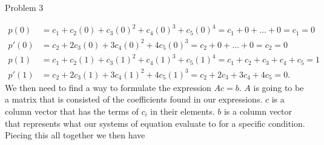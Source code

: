 \begin{problem}{Problem 3}
\begin{highlight}[Solution]
        \begin{align}
            p(0) & = c_{1} + c_{2}(0) + c_{3}(0)^{2} + c_{4}(0)^{3} + c_{5}(0)^{4} = c_{1} + 0 + \dots + 0 = c_{1} = 0 \\
            p'(0) & = c_{2} + 2c_{3}(0) + 3c_{4}(0)^{2} + 4c_{5}(0)^{3} = c_{2} + 0 + \dots + 0 = c_{2} = 0 \\
            p(1) & = c_{1} + c_{2}(1) + c_{3}(1)^{2} + c_{4}(1)^{3} + c_{5}(1)^{4} = c_{1} + c_{2} + c_{3} + c_{4} + c_{5} = 1 \\
            p'(1) & = c_{2} + 2c_{3}(1) + 3c_{4}(1)^{2} + 4c_{5}(1)^{3} = c_{2} + 2c_{3} + 3c_{4} + 4c_{5} = 0.
        \end{align}
        We then need to find a way to formulate the expression $Ac = b$. $A$ is going to be a matrix that is consisted of the coefficients found in our expressions. $c$ is a column vector that has the
        terms of $c_{i}$ in their elements. $b$ is a column vector that represents what our systems of equation evaluate to for a specific condition. Piecing this all together we then have


\end{highlight}
\end{problem}
